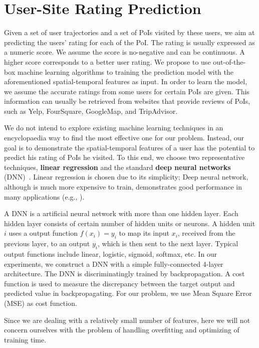 \section{User-Site Rating Prediction}
\label{sec:prediction}

Given a set of user trajectories and a set of PoIs visited by these users, we aim at predicting the users' rating for each of the PoI. The rating is usually expressed as a numeric score. We assume the score is no-negative and can be continuous. A higher score corresponds to a better user rating. We propose to use out-of-the-box machine learning algorithms to training the prediction model with the aforementioned spatial-temporal features as input. In order to learn the model, we assume the accurate ratings from some users for certain PoIs are given. This information can usually be retrieved from websites that provide reviews of PoIs, such as Yelp, FourSquare, GoogleMap, and TripAdvisor. 

We do not intend to explore existing machine learning techniques in an encyclopaedia way to find the most effective one for our problem. Instead, our goal is to demonstrate the spatial-temporal features of a user has the potential to predict his rating of PoIs he visited. To this end, we choose two representative techniques, \textbf{linear regression} and the standard \textbf{deep neural networks} (DNN)~\cite{schmidhuber2015deep}. Linear regression is chosen due to its simplicity; Deep neural network, although is much more expensive to train, demonstrates good performance in many applications (e.g., \cite{ruiz2013innovative, hinton2012deep, krizhevsky2012imagenet}).

A DNN is a artificial neural network with more than one hidden layer. Each hidden layer consists of certain number of hidden units or neurons. A hidden unit $i$ uses a output function $f(x_i) = y_i$ to map its input $x_i$, received from the previous layer, to an output $y_i$, which is then sent to the next layer. Typical output functions include linear, logistic, sigmoid, softmax, etc. In our experiments, we construct a DNN with a simple fully-connected 4-layer architecture. The DNN is discriminatingly trained by backpropagation. A cost function is used to measure the discrepancy between the target output and predicted value in backpropagating. For our problem, we use Mean Square Error (MSE) as cost function. 

Since we are dealing with a relatively small number of features, here we will not concern ourselves with the problem of handling overfitting and optimizing of training time.